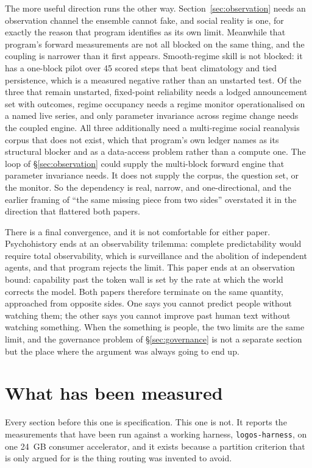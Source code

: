 \documentclass[11pt]{article}
\begin{document}
The more useful direction runs the other way. Section~\ref{sec:observation} needs an observation channel the ensemble cannot fake, and social reality is one, for exactly the reason that program identifies as its own limit. Meanwhile that program's forward measurements are not all blocked on the same thing, and the coupling is narrower than it first appears. Smooth-regime skill is not blocked: it has a one-block pilot over 45 scored steps that beat climatology and tied persistence, which is a measured negative rather than an unstarted test. Of the three that remain unstarted, fixed-point reliability needs a lodged announcement set with outcomes, regime occupancy needs a regime monitor operationalised on a named live series, and only parameter invariance across regime change needs the coupled engine. All three additionally need a multi-regime social reanalysis corpus that does not exist, which that program's own ledger names as its structural blocker and as a data-access problem rather than a compute one. The loop of \S\ref{sec:observation} could supply the multi-block forward engine that parameter invariance needs. It does not supply the corpus, the question set, or the monitor. So the dependency is real, narrow, and one-directional, and the earlier framing of ``the same missing piece from two sides'' overstated it in the direction that flattered both papers.

There is a final convergence, and it is not comfortable for either paper. Psychohistory ends at an observability trilemma: complete predictability would require total observability, which is surveillance and the abolition of independent agents, and that program rejects the limit. This paper ends at an observation bound: capability past the token wall is set by the rate at which the world corrects the model. Both papers therefore terminate on the same quantity, approached from opposite sides. One says you cannot predict people without watching them; the other says you cannot improve past human text without watching something. When the something is people, the two limits are the same limit, and the governance problem of \S\ref{sec:governance} is not a separate section but the place where the argument was always going to end up.

\section{What has been measured}
\label{sec:measured}

Every section before this one is specification. This one is not. It reports the measurements that have been run against a working harness, \texttt{logos-harness}, on one 24~GB consumer accelerator, and it exists because a partition criterion that is only argued for is the thing routing was invented to avoid.
\end{document}
